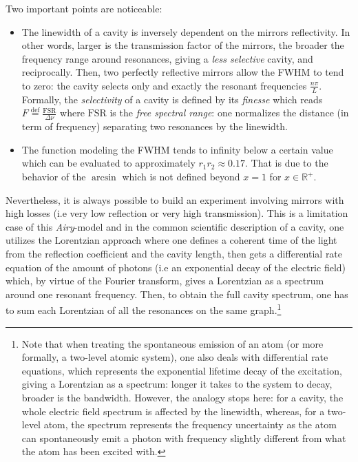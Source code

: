 \documentclass[11pt]{report}
\begin{document}
Two important points are noticeable:
\begin{itemize}
	\item The linewidth of a cavity is inversely dependent on the mirrors reflectivity. In other words, larger is the transmission factor of the mirrors, the broader the frequency range around resonances, giving a \textit{less selective} cavity, and reciprocally. Then, two perfectly reflective mirrors allow the FWHM to tend to zero: the cavity selects only and exactly the resonant frequencies $\frac{n\pi}{L}$. Formally, the \textit{selectivity} of a cavity is defined by its \textit{finesse} which reads $F \stackrel{\text{def}}{=} \frac{\textrm{FSR}}{\Delta\nu}$ where $\textrm{FSR}$ is the \textit{free spectral range}: one normalizes the distance (in term of frequency) separating two resonances by the linewidth.
	\item The function modeling the FWHM tends to infinity below a certain value which can be evaluated to approximately $r_1r_2 \approx 0.17$. That is due to the behavior of the $\arcsin$ which is not defined beyond $x=1$ for $x \in \mathbb{R}^+$. 
\end{itemize}

Nevertheless, it is always possible to build an experiment involving mirrors with high losses (i.e very low reflection or very high transmission). This is a limitation case of this \textit{Airy}-model and in the common scientific description of a cavity, one utilizes the Lorentzian approach where one defines a coherent time of the light from the reflection coefficient and the cavity length, then gets a differential rate equation of the amount of photons (i.e an exponential decay of the electric field) which, by virtue of the Fourier transform, gives a Lorentzian as a spectrum around one resonant frequency. Then, to obtain the full cavity spectrum, one has to sum each Lorentzian of all the resonances on the same graph.\footnote{Note that when treating the spontaneous emission of an atom (or more formally, a two-level atomic system), one also deals with differential rate equations, which represents the exponential lifetime decay of the excitation, giving a Lorentzian as a spectrum: longer it takes to the system to decay, broader is the bandwidth. However, the analogy stops here: for a cavity, the whole electric field spectrum is affected by the linewidth, whereas, for a two-level atom, the spectrum represents the frequency uncertainty as the atom can spontaneously emit a photon with frequency slightly different from what the atom has been excited with.}
\end{document}
